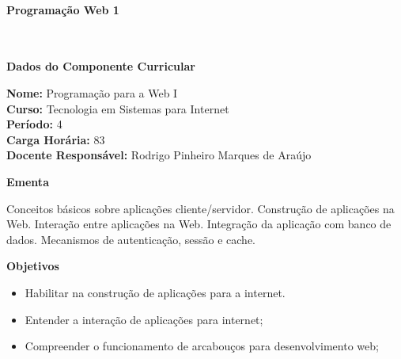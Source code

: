 \paragraph{Programação Web 1} \


\begin{snugshade}\begin{center}\textbf{
    Dados do Componente Curricular
}\end{center}\end{snugshade}

\noindent \textbf{Nome:}                Programação para a Web I
\\        \textbf{Curso:}               Tecnologia em Sistemas para Internet
\\        \textbf{Período:}             \unit{4}{\degree}
\\        \textbf{Carga Horária:}       \unit{83}{\hour}
\\        \textbf{Docente Responsável:} Rodrigo Pinheiro Marques de Araújo


\begin{snugshade}\begin{center}\textbf{
    Ementa
\vphantom{q}}\end{center}\end{snugshade}

\noindent
Conceitos básicos sobre aplicações cliente/servidor. Construção de aplicações na Web. Interação entre aplicações na Web. Integração da aplicação com banco de dados. Mecanismos de autenticação, sessão e cache. 

\begin{snugshade}\begin{center}\textbf{
    Objetivos
}\end{center}\end{snugshade}

\begin{itemize}

\item Habilitar na construção de aplicações para a internet.

\item Entender a interação de aplicações para internet;

\item Compreender o funcionamento de arcabouços para desenvolvimento web;

\end{itemize} 

